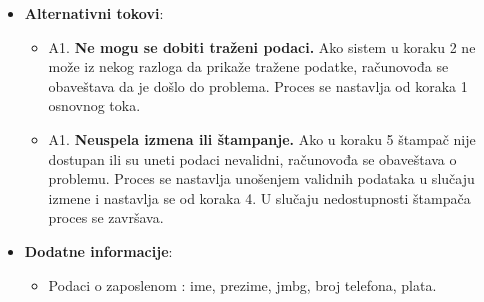 \begin{itemize}
  \item \textbf{Alternativni tokovi}:
      \begin{itemize}
        \item A1. \textbf{Ne mogu se dobiti traženi podaci.}
        Ako sistem u koraku 2 ne može iz nekog razloga da prikaže tražene podatke, računovođa se obaveštava da je došlo do problema.
        Proces se nastavlja od koraka 1 osnovnog toka.
        \item A1. \textbf{Neuspela izmena ili štampanje.}
        Ako u koraku 5 štampač nije dostupan ili su uneti podaci nevalidni, računovođa se obaveštava o problemu. Proces se nastavlja unošenjem
        validnih podataka u slučaju izmene i nastavlja se od koraka 4. U slučaju nedostupnosti štampača proces se završava.
      \end{itemize}

      
  \item \textbf{Dodatne informacije}:
      \begin{itemize}
        \item Podaci o zaposlenom : ime, prezime, jmbg, broj telefona, plata.
      \end{itemize}
\end{itemize}
